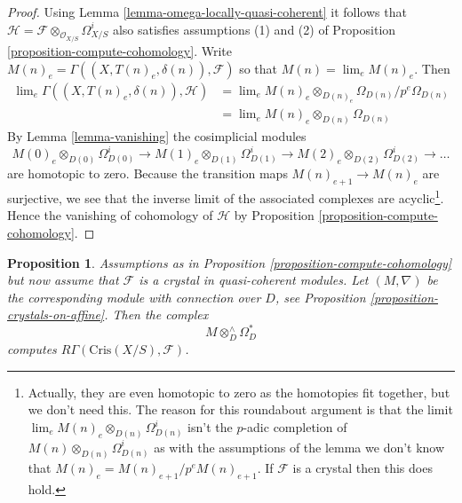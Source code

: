 \documentclass{stacks-project}
\theoremstyle{plain}
\newtheorem{proposition}[subsection]{Proposition}
\theoremstyle{definition}
\theoremstyle{remark}
\numberwithin{equation}{subsection}
\def\lim{\mathop{\mathrm{lim}}\nolimits}
\begin{document}
\begin{proof}
Using Lemma \ref{lemma-omega-locally-quasi-coherent} it follows that
$\mathcal{H} = \mathcal{F} \otimes_{\mathcal{O}_{X/S}} \Omega^i_{X/S}$
also satisfies assumptions (1) and (2) of
Proposition \ref{proposition-compute-cohomology}.
Write $M(n)_e = \Gamma((X, T(n)_e, \delta(n)), \mathcal{F})$
so that $M(n) = \lim_e M(n)_e$. Then
\begin{align*}
\lim_e \Gamma((X, T(n)_e, \delta(n)), \mathcal{H}) & =
\lim_e M(n)_e \otimes_{D(n)_e} \Omega_{D(n)}/p^e\Omega_{D(n)} \\
& = \lim_e M(n)_e \otimes_{D(n)} \Omega_{D(n)}
\end{align*}
By
Lemma \ref{lemma-vanishing}
the cosimplicial modules
$$
M(0)_e \otimes_{D(0)} \Omega^i_{D(0)} \to
M(1)_e \otimes_{D(1)} \Omega^i_{D(1)} \to
M(2)_e \otimes_{D(2)} \Omega^i_{D(2)} \to \ldots
$$
are homotopic to zero. Because the transition maps
$M(n)_{e + 1} \to M(n)_e$ are surjective, we see that
the inverse limit of the associated complexes are acyclic\footnote{Actually,
they are even homotopic to zero as the homotopies fit together, but we don't
need this. The reason for this roundabout argument is that
the limit $\lim_e M(n)_e \otimes_{D(n)} \Omega^i_{D(n)}$ isn't the
$p$-adic completion of $M(n) \otimes_{D(n)} \Omega^i_{D(n)}$ as with
the assumptions of the lemma we don't know that
$M(n)_e = M(n)_{e + 1}/p^eM(n)_{e + 1}$. If $\mathcal{F}$ is a crystal
then this does hold.}.
Hence the vanishing of cohomology of $\mathcal{H}$ by
Proposition \ref{proposition-compute-cohomology}.
\end{proof}

\begin{proposition}
\label{proposition-compute-cohomology-crystal}
Assumptions as in Proposition \ref{proposition-compute-cohomology}
but now assume that $\mathcal{F}$ is a crystal in quasi-coherent modules.
Let $(M, \nabla)$ be the corresponding module with connection over $D$, see
Proposition \ref{proposition-crystals-on-affine}. Then the complex
$$
M \otimes^\wedge_D \Omega^*_D
$$
computes $R\Gamma(\text{Cris}(X/S), \mathcal{F})$.
\end{proposition}
\end{document}
